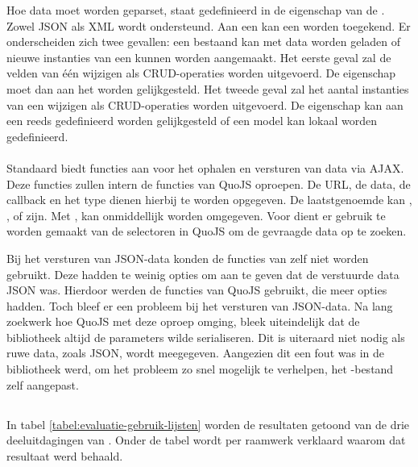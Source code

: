 Hoe data moet worden geparset, staat gedefinieerd in de  eigenschap van de .
Zowel JSON als XML wordt ondersteund.
Aan een  kan een  worden toegekend.
Er onderscheiden zich twee gevallen:  een bestaand  kan met data worden geladen of nieuwe instanties van een  kunnen worden aangemaakt.
Het eerste geval zal de velden van één  wijzigen als CRUD-operaties worden uitgevoerd.
De eigenschap moet dan aan het  worden gelijkgesteld.
Het tweede geval zal het aantal instanties van een  wijzigen als CRUD-operaties worden uitgevoerd.
De eigenschap kan aan een reeds gedefinieerd  worden gelijkgesteld of een model kan lokaal worden gedefinieerd.


\paragraph{\lungo}
Standaard biedt \lungo{} functies aan voor het ophalen en versturen van data via AJAX.
Deze functies zullen intern de functies van QuoJS oproepen.
De URL, de data, de callback en het type dienen hierbij te worden opgegeven.
De laatstgenoemde kan , ,  of  zijn.
Met ,  kan onmiddellijk worden omgegeven.
Voor  dient er gebruik te worden gemaakt van de selectoren in QuoJS om de gevraagde data op te zoeken.

Bij het versturen van JSON-data konden de functies van \lungo{} zelf niet worden gebruikt.
Deze hadden te weinig opties om aan te geven dat de verstuurde data JSON was.
Hierdoor werden de functies van QuoJS gebruikt, die meer opties hadden.
Toch bleef er een probleem bij het versturen van JSON-data.
Na lang zoekwerk hoe QuoJS met deze oproep omging, bleek uiteindelijk dat de bibliotheek altijd de parameters wilde serialiseren.
Dit is uiteraard niet nodig als ruwe data, zoals JSON, wordt meegegeven.
Aangezien dit een fout was in de bibliotheek werd, om het probleem zo snel mogelijk te verhelpen, het \js-bestand zelf aangepast.


\subsection{}
\label{sec:evaluatie-gebruik-lijsten}

In tabel \ref{tabel:evaluatie-gebruik-lijsten} worden de resultaten getoond van de drie deeluitdagingen van .
Onder de tabel wordt per raamwerk verklaard waarom dat resultaat werd behaald.

